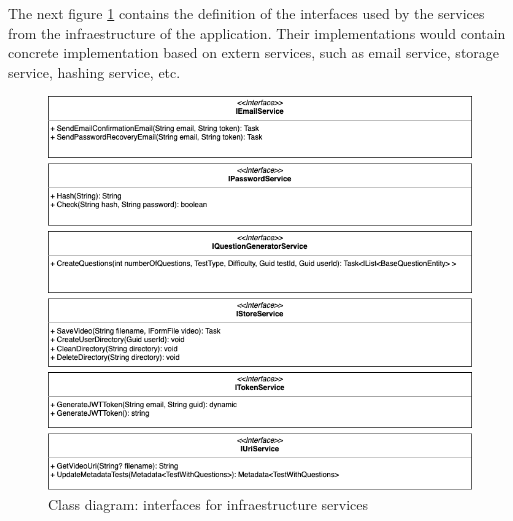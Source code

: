             \newpage
            The next figure \ref{fig:implementation_interfaces_2} contains the definition of the interfaces used by the services from the infraestructure of the application. Their implementations 
            would contain concrete implementation based on extern services, such as email service, storage service, hashing service, etc.
            \begin{figure}[H]
                \centering
                    \includegraphics[width=\textwidth]{assets/diagrams/interfaces_2.png}
                \caption{Class diagram: interfaces for infraestructure services}
                \label{fig:implementation_interfaces_2}
            \end{figure}

        \newpage
